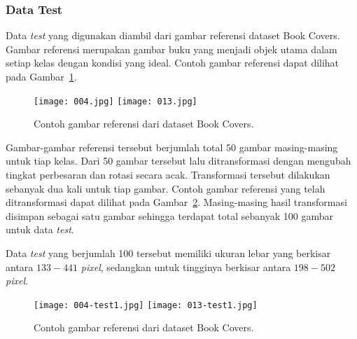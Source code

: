 \subsubsection{Data Test}
Data \textit{test} yang digunakan diambil dari gambar referensi dataset Book Covers. Gambar referensi merupakan gambar buku yang menjadi objek utama dalam setiap kelas dengan kondisi yang ideal. Contoh gambar referensi dapat dilihat pada Gambar~\ref{fig:referensi_book_covers}.

\begin{figure}[H]
	\centering
	\texttt{[image: 004.jpg]}
	\texttt{[image: 013.jpg]}
	\caption{Contoh gambar referensi dari dataset Book Covers.}
	\label{fig:referensi_book_covers}
\end{figure}

Gambar-gambar referensi tersebut berjumlah total 50 gambar masing-masing untuk tiap kelas. Dari 50 gambar tersebut lalu ditransformasi dengan mengubah tingkat perbesaran dan rotasi secara acak. Transformasi tersebut dilakukan sebanyak dua kali untuk tiap gambar. Contoh gambar referensi yang telah ditransformasi dapat dilihat pada Gambar~\ref{fig:transformasi_book_covers}. Masing-masing hasil transformasi disimpan sebagai satu gambar sehingga terdapat total sebanyak 100 gambar untuk data \textit{test}.

Data \textit{test} yang berjumlah 100 tersebut memiliki ukuran lebar yang berkisar antara $133 - 441$ \textit{pixel}, sedangkan untuk tingginya berkisar antara $198 - 502$ \textit{pixel}.

\begin{figure}[H]
	\centering
	\texttt{[image: 004-test1.jpg]}
	\texttt{[image: 013-test1.jpg]}
	\caption{Contoh gambar referensi dari dataset Book Covers.}
	\label{fig:transformasi_book_covers}
\end{figure}

